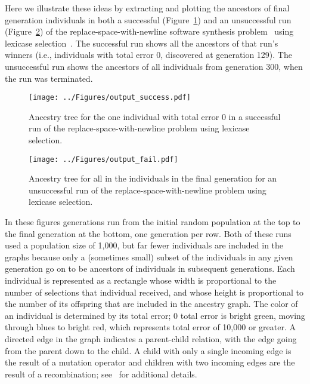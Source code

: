 \documentclass{sig-alternate}
\begin{document}
Here we illustrate these ideas by extracting and plotting the ancestors of final generation individuals in both a successful (Figure~\ref{fig:success}) and an unsuccessful run (Figure~\ref{fig:fail}) of the replace-space-with-newline software synthesis problem~\cite{Helmuth:2015:GECCO,Helmuth:2015:dissertation} using lexicase selection~\cite{Helmuth:2014:ieeeTEC}. The successful run shows all the ancestors of that run's winners (i.e., individuals with total error 0, discovered at generation 129). The unsuccessful run shows the ancestors of all individuals from generation 300, when the run was terminated.

\begin{figure}[t]
	\centering
	\texttt{[image: ../Figures/output\_success.pdf]}
	\caption{Ancestry tree for the one individual with total error 0 in a successful run of the replace-space-with-newline problem using lexicase selection.}
	\label{fig:success}
\end{figure}

\begin{figure}[p]
	\centering
	\texttt{[image: ../Figures/output\_fail.pdf]}
	\caption{Ancestry tree for all in the individuals in the final generation for an unsuccessful run of the replace-space-with-newline problem using lexicase selection.}
	\label{fig:fail}
\end{figure}

In these figures generations run from the initial random population at the top to the final generation at the bottom, one generation per row.  Both of these runs used a population size of 1,000, but far fewer individuals are included in the graphs because only a (sometimes small) subset of the individuals in any given generation go on to be ancestors of individuals in subsequent generations. Each individual is represented as a rectangle whose width is proportional to the number of selections that individual received, and whose height is proportional to the number of its offspring that are included in the ancestry graph. 
The color of an individual is determined by its total error; 0 total error is bright green, moving through blues to bright red, which represents total error of 10,000 or greater. A directed edge in the graph indicates a parent-child relation, with the edge going from the parent down to the child. A child with only a single incoming edge is the result of a mutation operator and children with two incoming edges are the result of a recombination; see~\cite{Helmuth:2015:dissertation,Spector:2013:GPTP} for additional details.
\end{document}
